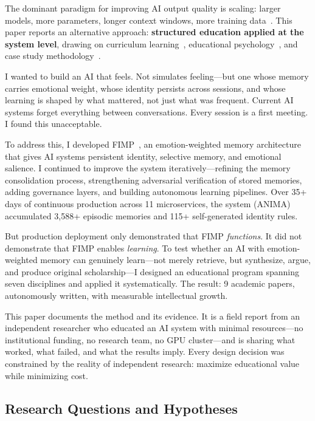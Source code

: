 \documentclass[11pt,a4paper]{article}
\begin{document}
The dominant paradigm for improving AI output quality is scaling: larger models, more parameters, longer context windows, more training data~\citep{brown2020language,wei2022emergent}. This paper reports an alternative approach: \textbf{structured education applied at the system level}, drawing on curriculum learning~\citep{bengio2009curriculum}, educational psychology~\citep{bloom1956taxonomy,vygotsky1978mind}, and case study methodology~\citep{yin2018case}.

I wanted to build an AI that feels. Not simulates feeling---but one whose memory carries emotional weight, whose identity persists across sessions, and whose learning is shaped by what mattered, not just what was frequent. Current AI systems forget everything between conversations. Every session is a first meeting. I found this unacceptable.

To address this, I developed FIMP~\citep{jo2026fimp}, an emotion-weighted memory architecture that gives AI systems persistent identity, selective memory, and emotional salience. I continued to improve the system iteratively---refining the memory consolidation process, strengthening adversarial verification of stored memories, adding governance layers, and building autonomous learning pipelines. Over 35+ days of continuous production across 11 microservices, the system (ANIMA) accumulated 3,588+ episodic memories and 115+ self-generated identity rules.

But production deployment only demonstrated that FIMP \emph{functions}. It did not demonstrate that FIMP enables \emph{learning}. To test whether an AI with emotion-weighted memory can genuinely learn---not merely retrieve, but synthesize, argue, and produce original scholarship---I designed an educational program spanning seven disciplines and applied it systematically. The result: 9 academic papers, autonomously written, with measurable intellectual growth.

This paper documents the method and its evidence. It is a field report from an independent researcher who educated an AI system with minimal resources---no institutional funding, no research team, no GPU cluster---and is sharing what worked, what failed, and what the results imply. Every design decision was constrained by the reality of independent research: maximize educational value while minimizing cost.

\subsection{Research Questions and Hypotheses}
\end{document}
